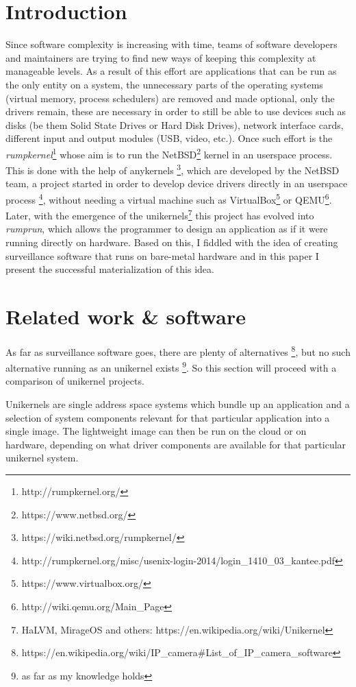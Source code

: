 \documentclass[10pt,a4paper,twoside]{article}
\begin{document}
\section{Introduction}
Since software complexity is increasing with time, teams of software developers and maintainers are trying to
find new ways of keeping this complexity at manageable levels. As a result of this effort are applications
that can be run as the only entity on a system,
the unnecessary parts of the operating systems (virtual memory, process schedulers) are removed and made
optional, only the drivers
remain, these are necessary in order to still be able to use devices
such as disks (be them Solid State Drives or Hard Disk Drives), network interface cards, different input and
output modules (USB, video, etc.).
Once such effort is the \textit{rumpkernel}\footnote{http://rumpkernel.org/}
 whose aim is to run the NetBSD\footnote{https://www.netbsd.org/} kernel in an userspace process.
 This is done with the help of anykernels \footnote{https://wiki.netbsd.org/rumpkernel/}, which are developed
 by the NetBSD team, a project started in order to develop device drivers directly in an userspace process
 \footnote{http://rumpkernel.org/misc/usenix-login-2014/login\_1410\_03\_kantee.pdf}, without needing a virtual machine such as VirtualBox\footnote{https://www.virtualbox.org/} or QEMU\footnote{http://wiki.qemu.org/Main\_Page}.
Later, with the emergence of the unikernels\footnote{HaLVM, MirageOS and others: https://en.wikipedia.org/wiki/Unikernel} this project has evolved into \textit{rumprun}, which allows the programmer to design an application as if it were running directly on hardware. Based on this, I fiddled with the idea of creating surveillance software that runs on bare-metal hardware and in this paper I present the successful materialization of this idea.

\section{Related work \& software}
As far as surveillance software goes, there are plenty of alternatives
\footnote{https://en.wikipedia.org/wiki/IP\_camera\#List\_of\_IP\_camera\_software},
 but no such alternative running as an unikernel exists
 \footnote{as far as my knowledge holds}.
 So this section will proceed with a comparison of unikernel projects.

Unikernels are single address space systems which bundle up an application and a
selection of system components relevant for that particular application into a single image.
The lightweight image can then be run on the cloud or on hardware, depending on what driver
components are available for that particular unikernel system.
\end{document}
